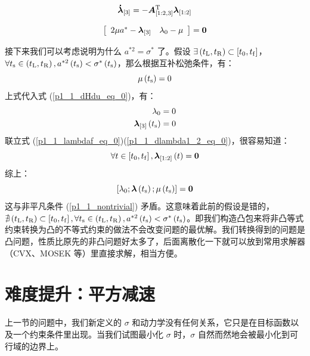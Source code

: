 \documentclass{article}
\numberwithin{equation}{section}
\begin{document}
\[
{{{\bm{\dot \lambda }}}_{\left[ 3 \right]}} =  - {\bm{A}}_{\left[ {1:2,3} \right]}^{\rm{T}}{{\bm{\lambda }}_{\left[ {1:2} \right]}}
\]

\begin{equation}
\label{p1_1_dHdu_eq_0}
\left[ {\begin{array}{*{20}{c}}
{2\mu {a^*} - {{\bm{\lambda }}_{\left[ 3 \right]}}}&{{\lambda _0} - \mu }
\end{array}} \right] = {\bf{0}}
\end{equation}

接下来我们可以考虑说明为什么 $a^{*2} = \sigma^*$ 了。假设 $\exists \left(t_{\rm{L}}, t_{\rm{R}}\right) \subset \left[ {{t_0},{t_{\rm{f}}}} \right]$，$\forall t_{\rm{s}} \in \left( {{t_{\rm{L}}},{t_{\rm{R}}}} \right), a^{*2}\left(t_{\rm{s}}\right) < \sigma^*\left(t_{\rm{s}}\right)$，那么根据互补松弛条件，有：
\[\mu\left(t_{\rm{s}}\right) = 0\]
上式代入式 (\ref{p1_1_dHdu_eq_0})，有：
\[\begin{aligned}
{\lambda _0} &= 0\\
{{\bm{\lambda }}_{\left[ 3 \right]}}\left( {{t_{\rm{s}}}} \right) &= 0
\end{aligned}\]
联立式 (\ref{p1_1_lambdaf_eq_0})(\ref{p1_1_dlambda1_2_eq_0})，很容易知道：
\[\forall t \in \left[ {{t_0},{t_{\rm{f}}}} \right],{{\bm{\lambda }}_{\left[ {1:2} \right]}}\left( t \right) = {\bf{0}}\]
综上：
\[\left[ {{\lambda _0};{\bm{\lambda }}\left( {{t_{\rm{s}}}} \right);\mu \left( {{t_{\rm{s}}}} \right)} \right] = {\bf{0}}\]
这与非平凡条件 (\ref{p1_1_nontrivial}) 矛盾。这意味着此前的假设是错的，$\nexists \left( {{t_{\rm{L}}},{t_{\rm{R}}}} \right) \subset \left[ {{t_0},{t_{\rm{f}}}} \right],\forall t_{\rm{s}} \in \left( {{t_{\rm{L}}},{t_{\rm{R}}}} \right),a^{*2}\left(t_{\rm{s}}\right) < \sigma^*\left(t_{\rm{s}}\right)$。即我们构造凸包来将非凸等式约束转换为凸的不等式约束的做法不会改变问题的最优解。我们转换得到的问题是凸问题，性质比原先的非凸问题好太多了，后面离散化一下就可以放到常用求解器（CVX、MOSEK 等）里直接求解，相当方便。

\section{难度提升：平方减速}
上一节的问题中，我们新定义的 $\sigma$ 和动力学没有任何关系，它只是在目标函数以及一个约束条件里出现。当我们试图最小化 $\sigma$ 时，$\sigma$ 自然而然地会被最小化到可行域的边界上。
\end{document}
